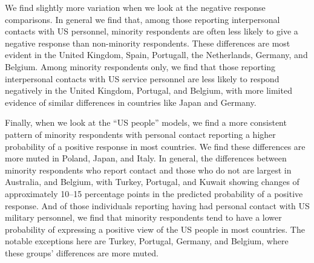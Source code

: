 We find slightly more variation when we look at the negative response comparisons. In general we find that, among those reporting interpersonal contacts with US personnel, minority respondents are often less likely to give a negative response than non-minority respondents. These differences are most evident in the United Kingdom, Spain, Portugall, the Netherlands, Germany, and Belgium. Among minority respondents only, we find that those reporting interpersonal contacts with US service personnel are less likely to respond negatively in the United Kingdom, Portugal, and Belgium, with more limited evidence of similar differences in countries like Japan and Germany.

Finally, when we look at the ``US people'' models, we find a more consistent pattern of minority respondents with personal contact reporting a higher probability of a positive response in most countries. We find these differences are more muted in Poland, Japan, and Italy. In general, the differences between minority respondents who report contact and those who do not are largest in Australia, and Belgium, with Turkey, Portugal, and Kuwait showing changes of approximately 10--15 percentage points in the predicted probability of a positive response. And of those individuals reporting having had personal contact with US military personnel, we find that minority respondents tend to have a lower probability of expressing a positive view of the US people in most countries. The notable exceptions here are Turkey, Portugal, Germany, and Belgium, where these groups' differences are more muted.

